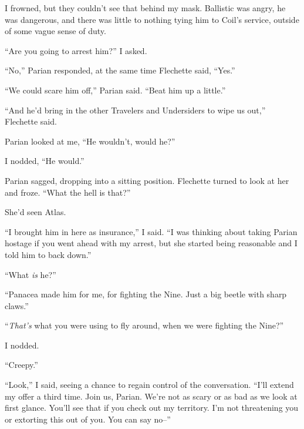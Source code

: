 I frowned, but they couldn't see that behind my mask.  Ballistic was angry, he was dangerous, and there was little to nothing tying him to Coil's service, outside of some vague sense of duty.



``Are you going to arrest him?'' I asked.



``No,'' Parian responded, at the same time Flechette said, ``Yes.''



``We could scare him off,'' Parian said.  ``Beat him up a little.''



``And he'd bring in the other Travelers and Undersiders to wipe us out,'' Flechette said.



Parian looked at me, ``He wouldn't, would he?''



I nodded, ``He would.''



Parian sagged, dropping into a sitting position.  Flechette turned to look at her and froze.  ``What the hell is that?''



She'd seen Atlas.



``I brought him in here as insurance,'' I said.  ``I was thinking about taking Parian hostage if you went ahead with my arrest, but she started being reasonable and I told him to back down.''



``What \emph{is} he?''



``Panacea made him for me, for fighting the Nine.  Just a big beetle with sharp claws.''



``\emph{That's} what you were using to fly around, when we were fighting the Nine?''



I nodded.



``Creepy.''



``Look,'' I said, seeing a chance to regain control of the conversation.  ``I'll extend my offer a third time.  Join us, Parian.  We're not as scary or as bad as we look at first glance.  You'll see that if you check out my territory.  I'm not threatening you or extorting this out of you.  You can say no--''



